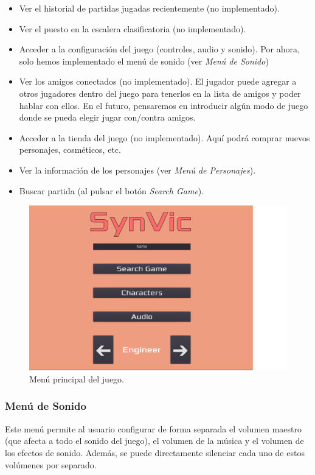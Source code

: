 \begin{itemize}
	\item Ver el historial de partidas jugadas recientemente (no implementado). 
	\item Ver el puesto en la escalera clasificatoria (no implementado).
	\item Acceder a la configuración del juego (controles, audio y sonido). Por ahora, solo hemos implementado el menú de sonido (ver \emph{Menú de Sonido})
	\item Ver los amigos conectados (no implementado). El jugador puede agregar a otros jugadores dentro del juego para tenerlos en la lista de amigos y poder hablar con ellos. En el futuro, pensaremos en introducir algún modo de juego donde se pueda elegir jugar con/contra amigos.
	\item Acceder a la tienda del juego (no implementado). Aquí podrá comprar nuevos personajes, cosméticos, etc.
	\item Ver la información de los personajes (ver \emph{Menú de Personajes}).
	\item Buscar partida (al pulsar el botón \emph{Search Game}).
\end{itemize}

\begin{figure}[h]
	\centering
	\includegraphics[width=0.7\linewidth]{figures/MainMenu}
	\caption{Menú principal del juego.}
	\label{fig:MainMenu}
\end{figure}

\subsubsection{Menú de Sonido}
Este menú permite al usuario configurar de forma separada el volumen maestro (que afecta a todo el sonido del juego), el volumen de la música y el volumen de los efectos de sonido. Además, se puede directamente silenciar cada uno de estos volúmenes por separado.

